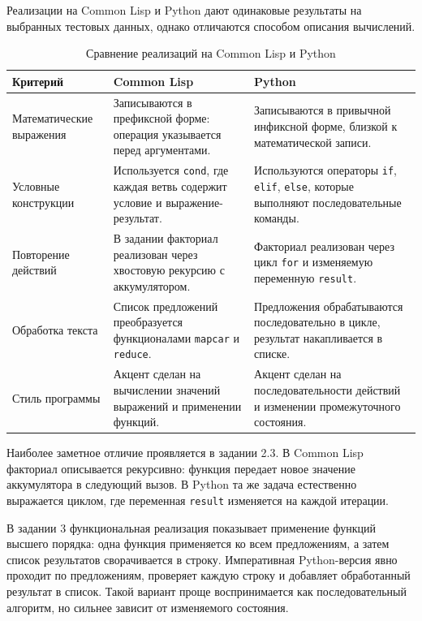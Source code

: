 \documentclass[14pt,a4paper]{extarticle}
\begin{document}
Реализации на Common Lisp и Python дают одинаковые результаты на выбранных тестовых данных, однако отличаются способом описания вычислений.

\begin{table}[H]
\centering
\caption{Сравнение реализаций на Common Lisp и Python}
\begin{tabularx}{\textwidth}{|p{}|X|X|}
\hline
\textbf{Критерий} & \textbf{Common Lisp} & \textbf{Python} \\
\hline
Математические выражения & Записываются в префиксной форме: операция указывается перед аргументами. & Записываются в привычной инфиксной форме, близкой к математической записи. \\
\hline
Условные конструкции & Используется \texttt{cond}, где каждая ветвь содержит условие и выражение-результат. & Используются операторы \texttt{if}, \texttt{elif}, \texttt{else}, которые выполняют последовательные команды. \\
\hline
Повторение действий & В задании факториал реализован через хвостовую рекурсию с аккумулятором. & Факториал реализован через цикл \texttt{for} и изменяемую переменную \texttt{result}. \\
\hline
Обработка текста & Список предложений преобразуется функционалами \texttt{mapcar} и \texttt{reduce}. & Предложения обрабатываются последовательно в цикле, результат накапливается в списке. \\
\hline
Стиль программы & Акцент сделан на вычислении значений выражений и применении функций. & Акцент сделан на последовательности действий и изменении промежуточного состояния. \\
\hline
\end{tabularx}
\end{table}

Наиболее заметное отличие проявляется в задании 2.3. В Common Lisp факториал описывается рекурсивно: функция передает новое значение аккумулятора в следующий вызов. В Python та же задача естественно выражается циклом, где переменная \texttt{result} изменяется на каждой итерации.

В задании 3 функциональная реализация показывает применение функций высшего порядка: одна функция применяется ко всем предложениям, а затем список результатов сворачивается в строку. Императивная Python-версия явно проходит по предложениям, проверяет каждую строку и добавляет обработанный результат в список. Такой вариант проще воспринимается как последовательный алгоритм, но сильнее зависит от изменяемого состояния.
\end{document}
